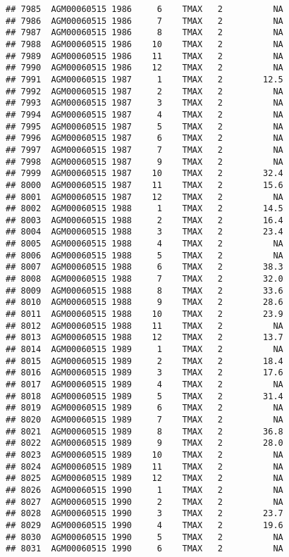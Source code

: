 \documentclass{article}\usepackage[]{graphicx}\usepackage[]{color}
\makeatletter
\newenvironment{kframe}{%
 \def\at@end@of@kframe{}%
 \ifinner\ifhmode%
  \def\at@end@of@kframe{\end{minipage}}%
  \begin{minipage}{\columnwidth}%
 \fi\fi%
 \def\FrameCommand##1{\hskip\@totalleftmargin \hskip-\fboxsep
 \colorbox{shadecolor}{##1}\hskip-\fboxsep
     \hskip-\linewidth \hskip-\@totalleftmargin \hskip\columnwidth}%
 \MakeFramed {\advance\hsize-\width
   \@totalleftmargin\z@ \linewidth\hsize
   \@setminipage}}%
 {\par\unskip\endMakeFramed%
 \at@end@of@kframe}
\newenvironment{knitrout}{}{} %
\makeatother
\begin{document}
\begin{knitrout}
\begin{kframe}
\begin{verbatim}
## 7985  AGM00060515 1986     6    TMAX   2          NA
## 7986  AGM00060515 1986     7    TMAX   2          NA
## 7987  AGM00060515 1986     8    TMAX   2          NA
## 7988  AGM00060515 1986    10    TMAX   2          NA
## 7989  AGM00060515 1986    11    TMAX   2          NA
## 7990  AGM00060515 1986    12    TMAX   2          NA
## 7991  AGM00060515 1987     1    TMAX   2        12.5
## 7992  AGM00060515 1987     2    TMAX   2          NA
## 7993  AGM00060515 1987     3    TMAX   2          NA
## 7994  AGM00060515 1987     4    TMAX   2          NA
## 7995  AGM00060515 1987     5    TMAX   2          NA
## 7996  AGM00060515 1987     6    TMAX   2          NA
## 7997  AGM00060515 1987     7    TMAX   2          NA
## 7998  AGM00060515 1987     9    TMAX   2          NA
## 7999  AGM00060515 1987    10    TMAX   2        32.4
## 8000  AGM00060515 1987    11    TMAX   2        15.6
## 8001  AGM00060515 1987    12    TMAX   2          NA
## 8002  AGM00060515 1988     1    TMAX   2        14.5
## 8003  AGM00060515 1988     2    TMAX   2        16.4
## 8004  AGM00060515 1988     3    TMAX   2        23.4
## 8005  AGM00060515 1988     4    TMAX   2          NA
## 8006  AGM00060515 1988     5    TMAX   2          NA
## 8007  AGM00060515 1988     6    TMAX   2        38.3
## 8008  AGM00060515 1988     7    TMAX   2        32.0
## 8009  AGM00060515 1988     8    TMAX   2        33.6
## 8010  AGM00060515 1988     9    TMAX   2        28.6
## 8011  AGM00060515 1988    10    TMAX   2        23.9
## 8012  AGM00060515 1988    11    TMAX   2          NA
## 8013  AGM00060515 1988    12    TMAX   2        13.7
## 8014  AGM00060515 1989     1    TMAX   2          NA
## 8015  AGM00060515 1989     2    TMAX   2        18.4
## 8016  AGM00060515 1989     3    TMAX   2        17.6
## 8017  AGM00060515 1989     4    TMAX   2          NA
## 8018  AGM00060515 1989     5    TMAX   2        31.4
## 8019  AGM00060515 1989     6    TMAX   2          NA
## 8020  AGM00060515 1989     7    TMAX   2          NA
## 8021  AGM00060515 1989     8    TMAX   2        36.8
## 8022  AGM00060515 1989     9    TMAX   2        28.0
## 8023  AGM00060515 1989    10    TMAX   2          NA
## 8024  AGM00060515 1989    11    TMAX   2          NA
## 8025  AGM00060515 1989    12    TMAX   2          NA
## 8026  AGM00060515 1990     1    TMAX   2          NA
## 8027  AGM00060515 1990     2    TMAX   2          NA
## 8028  AGM00060515 1990     3    TMAX   2        23.7
## 8029  AGM00060515 1990     4    TMAX   2        19.6
## 8030  AGM00060515 1990     5    TMAX   2          NA
## 8031  AGM00060515 1990     6    TMAX   2          NA

\end{verbatim}
\end{kframe}
\end{knitrout}
\end{document}
